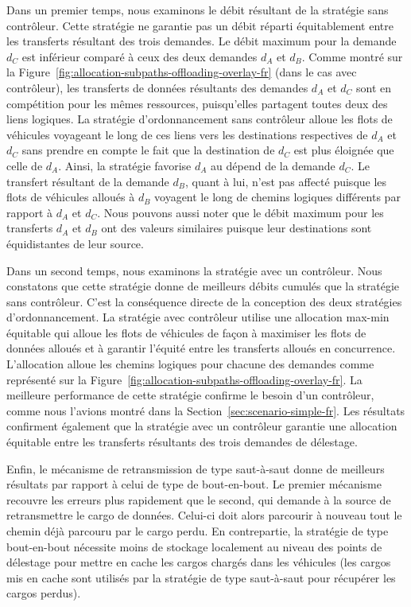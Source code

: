 Dans un premier temps, nous examinons le débit résultant de la stratégie sans contrôleur. Cette stratégie ne garantie pas un débit réparti équitablement entre les transferts résultant des trois demandes. Le débit maximum pour la demande $d_C$ est inférieur comparé à ceux des deux demandes $d_A$ et $d_B$. Comme montré sur la Figure~\ref{fig:allocation-subpaths-offloading-overlay-fr} (dans le cas avec contrôleur), les transferts de données résultants des demandes $d_A$ et $d_C$ sont en compétition pour les mêmes ressources, puisqu’elles partagent toutes deux des liens logiques. La stratégie d’ordonnancement sans contrôleur alloue les flots de véhicules voyageant le long de ces liens vers les destinations respectives de $d_A$ et $d_C$ sans prendre en compte le fait que la destination de $d_C$ est plus éloignée que celle de $d_A$. Ainsi, la stratégie favorise $d_A$ au dépend de la demande $d_C$. Le transfert résultant de la demande $d_B$, quant à lui, n’est pas affecté puisque les flots de véhicules alloués à $d_B$ voyagent le long de chemins logiques différents par rapport à $d_A$ et $d_C$. Nous pouvons aussi noter que le débit maximum pour les transferts $d_A$ et $d_B$ ont des valeurs similaires puisque leur destinations sont équidistantes de leur source.
 
Dans un second temps, nous examinons la stratégie avec un contrôleur. Nous constatons que cette stratégie donne de meilleurs débits cumulés que la stratégie sans contrôleur. C’est la conséquence directe de la conception des deux stratégies d’ordonnancement. La stratégie avec contrôleur utilise une allocation max-min équitable qui alloue les flots de véhicules de façon à maximiser les flots de données alloués et à garantir l’équité entre les transferts alloués en concurrence. L'allocation alloue les chemins logiques pour chacune des demandes comme représenté sur la Figure~\ref{fig:allocation-subpaths-offloading-overlay-fr}. La meilleure performance de cette stratégie confirme le besoin d'un contrôleur, comme nous l’avions montré dans la Section~\ref{sec:scenario-simple-fr}. Les résultats confirment également que la stratégie avec un contrôleur garantie une allocation équitable entre les transferts résultants des trois demandes de délestage.  

Enfin, le mécanisme de retransmission de type saut-à-saut donne de meilleurs résultats par rapport à celui de type de bout-en-bout. Le premier mécanisme recouvre les erreurs plus rapidement que le second, qui demande à la source de retransmettre le cargo de données. Celui-ci doit alors parcourir à nouveau tout le chemin déjà parcouru par le cargo perdu. En contrepartie, la stratégie de type bout-en-bout nécessite moins de stockage localement au niveau des points de délestage pour mettre en cache les cargos chargés dans les véhicules (les cargos mis en cache sont utilisés par la stratégie de type saut-à-saut pour récupérer les cargos perdus).  
 
